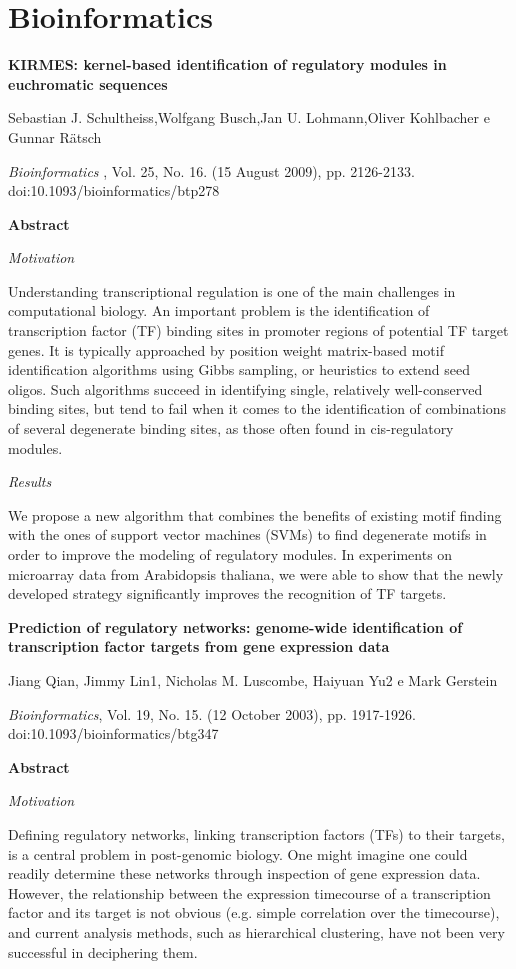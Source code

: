 \chapter{Bioinformatics}

{\Large \bf KIRMES: kernel-based identification of regulatory modules in euchromatic sequences}

Sebastian J. Schultheiss,Wolfgang Busch,Jan U. Lohmann,Oliver Kohlbacher e Gunnar Rätsch

{\it Bioinformatics} , Vol. 25, No. 16. (15 August 2009), pp. 2126-2133.\\ doi:10.1093/bioinformatics/btp278
 
{\large \bf Abstract}

{\it Motivation}

Understanding transcriptional regulation is one of the main challenges in computational biology. An important problem is the identification of transcription factor (TF) binding sites in promoter regions of potential TF target genes. It is typically approached by position weight matrix-based motif identification algorithms using Gibbs sampling, or heuristics to extend seed oligos. Such algorithms succeed in identifying single, relatively well-conserved binding sites, but tend to fail when it comes to the identification of combinations of several degenerate binding sites, as those often found in cis-regulatory modules. 

{\it Results}

 We propose a new algorithm that combines the benefits of existing motif finding with the ones of support vector machines (SVMs) to find degenerate motifs in order to improve the modeling of regulatory modules. In experiments on microarray data from Arabidopsis thaliana, we were able to show that the newly developed strategy significantly improves the recognition of TF targets. 
 
 
 
 {\Large \bf Prediction of regulatory networks: genome-wide identification of transcription factor targets from gene expression data}
 
Jiang Qian, Jimmy Lin1, Nicholas M. Luscombe, Haiyuan Yu2 e Mark Gerstein

{\it Bioinformatics}, Vol. 19, No. 15. (12 October 2003), pp. 1917-1926.\\ doi:10.1093/bioinformatics/btg347

{\large \bf Abstract}

{\it Motivation}

 Defining regulatory networks, linking transcription factors (TFs) to their targets, is a central problem in post-genomic biology. One might imagine one could readily determine these networks through inspection of gene expression data. However, the relationship between the expression timecourse of a transcription factor and its target is not obvious (e.g. simple correlation over the timecourse), and current analysis methods, such as hierarchical clustering, have not been very successful in deciphering them. 

